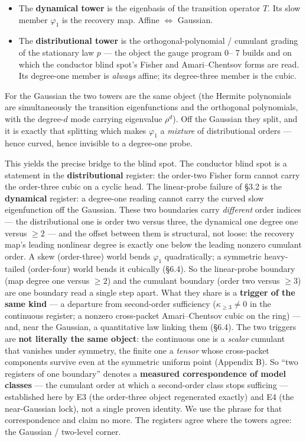 \documentclass[
  letterpaper,
  11pt]{article}
\providecommand{\tightlist}{%
  \setlength{\itemsep}{0pt}\setlength{\parskip}{0pt}}
\providecommand{\hebrewfont}{}
\DeclareRobustCommand{\heb}[1]{%
  \BeginAccSupp{ActualText=L}{\hebrewfont #1}\EndAccSupp{}%
}
\renewcommand{\hebrewfont}{\HebrewSysFont}%
\theoremstyle{plain}
\theoremstyle{definition}
\theoremstyle{remark}
\begin{document}
\begin{itemize}
\tightlist
\item
  The \textbf{dynamical tower} is the eigenbasis of the transition operator \(T\). Its slow member \(\varphi_1\) is the recovery map. Affine \(\iff\) Gaussian.
\item
  The \textbf{distributional tower} is the orthogonal-polynomial / cumulant grading of the stationary law \(p\) --- the object the gauge program \heb{ל}0--\heb{ל}7 builds and on which the conductor blind spot's Fisher and Amari--Chentsov forms are read. Its degree-one member is \emph{always} affine; its degree-three member is the cubic.
\end{itemize}

For the Gaussian the two towers are the same object (the Hermite polynomials are simultaneously the transition eigenfunctions and the orthogonal polynomials, with the degree-\(d\) mode carrying eigenvalue \(\rho^d\)). Off the Gaussian they split, and it is exactly that splitting which makes \(\varphi_1\) a \emph{mixture} of distributional orders --- hence curved, hence invisible to a degree-one probe.

This yields the precise bridge to the blind spot. The conductor blind spot is a statement in the \textbf{distributional} register: the order-two Fisher form cannot carry the order-three cubic on a cyclic head. The linear-probe failure of §3.2 is the \textbf{dynamical} register: a degree-one reading cannot carry the curved slow eigenfunction off the Gaussian. These two boundaries carry \emph{different} order indices --- the distributional one is order two versus three, the dynamical one degree one versus \(\ge 2\) --- and the offset between them is structural, not loose: the recovery map's leading nonlinear degree is exactly one below the leading nonzero cumulant order. A skew (order-three) world bends \(\varphi_1\) quadratically; a symmetric heavy-tailed (order-four) world bends it cubically (§6.4). So the linear-probe boundary (map degree one versus \(\ge 2\)) and the cumulant boundary (order two versus \(\ge 3\)) are one boundary read a single step apart. What they share is a \textbf{trigger of the same kind} --- a departure from second-order sufficiency (\(\kappa_{\ge 3}\neq 0\) in the continuous register; a nonzero cross-packet Amari--Chentsov cubic on the ring) --- and, near the Gaussian, a quantitative law linking them (§6.4). The two triggers are \textbf{not literally the same object}: the continuous one is a \emph{scalar} cumulant that vanishes under symmetry, the finite one a \emph{tensor} whose cross-packet components survive even at the symmetric uniform point (Appendix B). So ``two registers of one boundary'' denotes a \textbf{measured correspondence of model classes} --- the cumulant order at which a second-order class stops sufficing --- established here by E3 (the order-three object regenerated exactly) and E4 (the near-Gaussian lock), not a single proven identity. We use the phrase for that correspondence and claim no more. The registers agree where the towers agree: the Gaussian / two-level corner.
\end{document}
